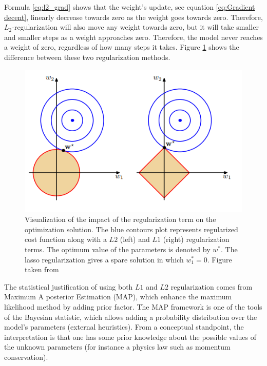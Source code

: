 Formula \ref{eq:l2_grad} shows that the weight's update, see equation \ref{eq:Gradient decent}, linearly decrease towards zero as the weight goes towards zero. Therefore, $L_2$-regularization will also move any weight towards zero, but it will take smaller and smaller steps as a weight approaches zero. Therefore, the model never reaches a weight of zero, regardless of how many steps it takes. 
Figure \ref{fig:L1vsL2} shows the difference between these two regularization methods. 


\begin{figure}[!h]
\centering
\includegraphics{figures/L1vsL2.PNG}
\caption{Visualization of the impact of the regularization term on the optimization solution. The blue contours plot represents regularized cost function along with a $L2$ (left) and $L1$ (right) regularization terms. The optimum value of the parameters is denoted by $w^{*}$. The lasso regularization gives a spare solution in which $w_{1}^*=0$. Figure taken from \cite{bishop}  
\label{fig:L1vsL2}}
\end{figure}
The statistical justification of using both $L1$ and $L2$ regularization comes from Maximum A posterior Estimation (MAP), which enhance the maximum likelihood method by adding prior factor. The MAP framework is one of the tools of the Bayesian statistic, which allows adding a probability distribution over the model's parameters (external heuristics). From a conceptual standpoint, the interpretation is that one has some prior knowledge about the possible values of the unknown parameters (for instance a physics law such as momentum conservation).

